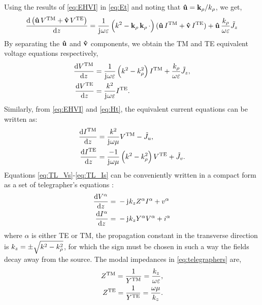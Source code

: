 \documentclass[12pt]{article}
\begin{document}
%
Using the results of \eqref{eq:EHVI} in \eqref{eq:Et} and noting that $\mathbf{\hat u} = \mathbf{k}_{\rho}/k_{\rho}$, we get,
%
\begin{equation}
  \dv{\left(\mathbf{\hat u} \, V^{\mathrm{TM}} + \mathbf{\hat v} \,V^{\mathrm{TE}} \right)}{z} = \frac{1}{\mathrm{j}\mkern1mu \omega \varepsilon}\left( k^2 - \mathbf{k}_{\rho} \,\mathbf{k}_{\rho}
  \,\cdot \right) (\mathbf{\hat u}\, I^{\mathrm{TM}} +
  \mathbf{\hat v} \, I^{\mathrm{TE}}) + \mathbf{\hat u} \, \frac{k_{\rho}}{\omega \varepsilon} \tilde{J}_z
  \label{eq:Vinuv}
\end{equation}
%
By separating the $\mathbf{\hat u}$ and $\mathbf{\hat v}$ components, we obtain the TM and TE equivalent voltage equations respectively,
%
\begin{subequations}
  \begin{align}
    \dv{V^{\mathrm{TM}}}{z} ={}&
    \frac{1}{\mathrm{j}\mkern1mu \omega \varepsilon}\left( k^2 - k_{\rho}^2 \right)I^{\mathrm{TM}} + \frac{k_{\rho}}{\omega \varepsilon} \tilde{J}_z,
    \label{eq:V_TM}\\
    \dv{V^{\mathrm{TE}}}{z} ={}&
    \frac{k^2}{\mathrm{j}\mkern1mu \omega \varepsilon} I^{\mathrm{TE}}.
    \label{eq:V_TE}
  \end{align}
  \label{eq:TL_Vs}%
\end{subequations}
%
Similarly, from \eqref{eq:EHVI} and \eqref{eq:Ht}, the equivalent current equations can be written as:
%
\begin{subequations}
  \begin{align}
    \dv{I^{\mathrm{TM}}}{z} ={}&
    \frac{k^2}{\mathrm{j}\mkern1mu \omega \mu} V^{\mathrm{TM}} - \tilde{J}_u,
    \label{eq:I_TM}\\
    \dv{I^{\mathrm{TE}}}{z} ={}&
    \frac{-1}{\mathrm{j}\mkern1mu \omega \mu}\left( k^2 - k_{\rho}^2 \right)V^{\mathrm{TE}} + \tilde{J}_v.
    \label{eq:I_TE}
  \end{align}
  \label{eq:TL_Is}%
\end{subequations}
%
Equations \eqref{eq:TL_Vs}-\eqref{eq:TL_Is} can be conveniently written in a compact form as a set of telegrapher's equations \cite[p. 190]{Felsen1994}:
%
\begin{subequations}
  \begin{align}
    \dv{V^{\alpha}}{z} ={}& -\mathrm{j}\mkern1mu k_z Z^{\alpha}I^{\alpha} + v^{\alpha}
    \label{eq:TL_finalV}\\
    \dv{I^{\alpha}}{z} ={}& -\mathrm{j}\mkern1mu k_z Y^{\alpha}V^{\alpha} + i^{\alpha}
    \label{eq:TL_finalI}
  \end{align}
  \label{eq:telegraphers}%
\end{subequations}
%
where $\alpha$ is either TE or TM, the propagation constant in the transverse direction is $k_z = \pm \sqrt{k^2 - k_{\rho}^2}$, for which the sign must be chosen in such a way the fields decay away from the source. The modal impedances in \eqref{eq:telegraphers} are,
%
\begin{subequations}
  \begin{align}
    Z^{\mathrm{TM}} = \frac{1}{Y^{\mathrm{TM}}} = \frac{k_z}{\omega \varepsilon},
    \label{eq:z_TM}\\
    Z^{\mathrm{TE}} = \frac{1}{Y^{\mathrm{TE}}} = \frac{\omega \mu}{k_z}.
    \label{eq:z_TE}
  \end{align}
  \label{eq:Z}%
\end{subequations}
%
\end{document}
